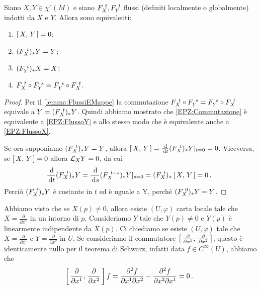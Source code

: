 \begin{proposition} \label{prop:EquivalenzaParentesiZero}
	Siano $X,Y\in\chi^r(M)$ e siano $F_{X}^{\ t},F_{Y}^{\ t}$ flussi (definiti localmente o globalmente) indotti da $X$ e $Y$. Allora sono equivalenti:
	\begin{enumerate}
	\item $\left[\,X,\,Y\,\right]=0$; \label{EPZ:ParentesiZero}
	\item $(F_{X}^{\ t})_*Y=Y$; \label{EPZ:FlussoY}
	\item $(F_{Y}^{\ t})_*X=X$; \label{EPZ:FlussoX}
	\item $F_{X}^{\ t}\circ F_{Y}^{\ s}=F_{Y}^{\ s}\circ F_{X}^{\ t}$. \label{EPZ:Commutazione}
	\end{enumerate}
\end{proposition}

\begin{proof}
	Per il \cref{lemma:FlussiEMappe} la commutazione $F_{X}^{\ t}\circ F_{Y}^{\ s}=F_{Y}^{\ s}\circ F_{X}^{\ t}$ equivale a $Y=(F_{X}^{\ t})_*Y$. Quindi abbiamo mostrato che \ref{EPZ:Commutazione} è equivalente a \ref{EPZ:FlussoY} e allo stesso modo che è equivalente anche a \ref{EPZ:FlussoX}.
	
	Se ora supponiamo $(F_{X}^{\ t})_*Y=Y$, allora $\left[\,X,\,Y\,\right]=\frac{\,\mathrm d}{\,\mathrm d t}(F_{X}^{\ t})_*Y|_{t=0}=0$. Viceversa, se $\left[\,X,\,Y\,\right]=0$ allora $\mathcal L_XY=0$, da cui
	\begin{equation*}
		\frac{\,\mathrm d}{\,\mathrm d t}(F_{X}^{\ t})_*Y=\frac{\,\mathrm d}{\,\mathrm d s}(F_{X}^{\ t+s})_*Y|_{s=0}=(F_{X}^{\ t})_*\left[\,X,\,Y\,\right]=0\, \text{. }
	\end{equation*}
	Perciò  $(F_{X}^{\ t})_*Y$ è costante in $t$ ed è uguale a Y, perché $(F_{X}^{\ 0})_*Y=Y$.
\end{proof}

Abbiamo visto che se $X(p)\ne 0$, allora esiste $(U,\varphi)$ carta locale tale che $X=\frac{\partial}{\partial x^1}$ in un intorno di $p$. Consideriamo $Y$ tale che $Y(p)\neq 0$ e $Y(p)$ è linearmente indipendente da $X(p)$. Ci chiediamo se esiste $(U,\varphi)$ tale che $X=\frac{\partial}{\partial x^1}$ e $Y=\frac{\partial}{\partial x^2}$ in $U$. Se consideriamo il commutatore $\left[\,\frac{\partial}{\partial x^1},\,\frac{\partial}{\partial x^2}\,\right]$, questo è identicamente nullo per il teorema di Schwarz, infatti data $f\in C^\infty(U)$, abbiamo che
\begin{equation*}
	\left[\,\frac{\partial}{\partial x^1},\,\frac{\partial}{\partial x^2}\,\right]f=\frac{\partial^2f}{\partial x^1\partial x^2}-\frac{\partial^2f}{\partial x^2\partial x^1}=0\, \text{. }
\end{equation*}

